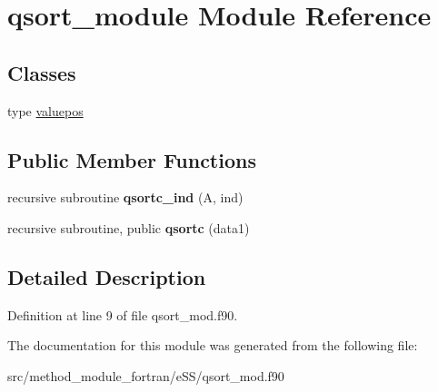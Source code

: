 \hypertarget{classqsort__module}{\section{qsort\-\_\-module Module Reference}
\label{classqsort__module}
}
\subsection*{Classes}
\begin{DoxyCompactItemize}
\item 
type \hyperlink{structqsort__module_1_1valuepos}{valuepos}
\end{DoxyCompactItemize}
\subsection*{Public Member Functions}
\begin{DoxyCompactItemize}
\item 
\hypertarget{classqsort__module_a2c31742768e6abba81061eea4d5f0c5f}{recursive subroutine {\bfseries qsortc\-\_\-ind} (A, ind)}\label{classqsort__module_a2c31742768e6abba81061eea4d5f0c5f}

\item 
\hypertarget{classqsort__module_a1ea5ba49ca8e9c72adb03979e72f962e}{recursive subroutine, public {\bfseries qsortc} (data1)}\label{classqsort__module_a1ea5ba49ca8e9c72adb03979e72f962e}

\end{DoxyCompactItemize}


\subsection{Detailed Description}


Definition at line 9 of file qsort\-\_\-mod.\-f90.



The documentation for this module was generated from the following file\-:\begin{DoxyCompactItemize}
\item 
src/method\-\_\-module\-\_\-fortran/e\-S\-S/qsort\-\_\-mod.\-f90\end{DoxyCompactItemize}
